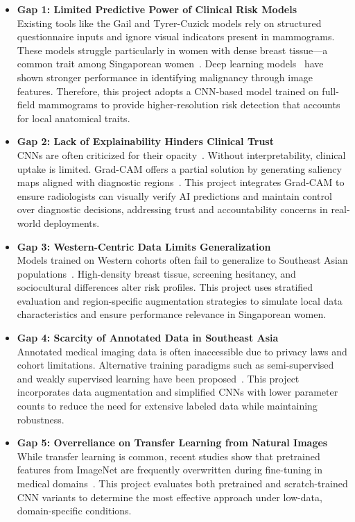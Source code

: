 \documentclass[12pt]{article}
\begin{document}
\begin{itemize}
    \item \textbf{Gap 1: Limited Predictive Power of Clinical Risk Models}\\
    Existing tools like the Gail and Tyrer-Cuzick models rely on structured questionnaire inputs and ignore visual indicators present in mammograms. These models struggle particularly in women with dense breast tissue—a common trait among Singaporean women~\cite{6}. Deep learning models~\cite{1,7} have shown stronger performance in identifying malignancy through image features. Therefore, this project adopts a CNN-based model trained on full-field mammograms to provide higher-resolution risk detection that accounts for local anatomical traits.

    \item \textbf{Gap 2: Lack of Explainability Hinders Clinical Trust}\\
    CNNs are often criticized for their opacity~\cite{3,5}. Without interpretability, clinical uptake is limited. Grad-CAM offers a partial solution by generating saliency maps aligned with diagnostic regions~\cite{5}. This project integrates Grad-CAM to ensure radiologists can visually verify AI predictions and maintain control over diagnostic decisions, addressing trust and accountability concerns in real-world deployments.

    \item \textbf{Gap 3: Western-Centric Data Limits Generalization}\\
    Models trained on Western cohorts often fail to generalize to Southeast Asian populations~\cite{6}. High-density breast tissue, screening hesitancy, and sociocultural differences alter risk profiles. This project uses stratified evaluation and region-specific augmentation strategies to simulate local data characteristics and ensure performance relevance in Singaporean women.

    \item \textbf{Gap 4: Scarcity of Annotated Data in Southeast Asia}\\
    Annotated medical imaging data is often inaccessible due to privacy laws and cohort limitations. Alternative training paradigms such as semi-supervised and weakly supervised learning have been proposed~\cite{4}. This project incorporates data augmentation and simplified CNNs with lower parameter counts to reduce the need for extensive labeled data while maintaining robustness.

    \item \textbf{Gap 5: Overreliance on Transfer Learning from Natural Images}\\
    While transfer learning is common, recent studies show that pretrained features from ImageNet are frequently overwritten during fine-tuning in medical domains~\cite{2}. This project evaluates both pretrained and scratch-trained CNN variants to determine the most effective approach under low-data, domain-specific conditions.
\end{itemize}
\end{document}

